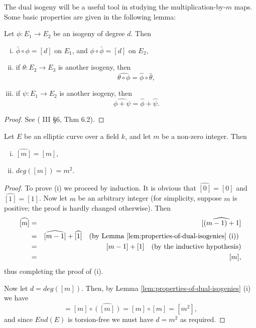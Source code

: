 The dual isogeny will be a useful tool in studying the multiplication-by-$m$ maps.
Some basic properties are given in the following lemma:
\begin{lem}
  \label{lem:properties-of-dual-isogenies}
  Let $\phi \colon E_{1} \rightarrow E_{2}$ be an isogeny of degree $d$.  Then
  \begin{enumerate}[(i)]
  \item $\bar{\phi} \circ \phi = \left[ d \right]$ on $E_{1}$, and $\phi \circ
    \bar{\phi} = \left[ d \right]$ on $E_{2}$,
  \item if $\theta \colon E_{2} \rightarrow E_{3}$ is another isogeny, then
    \begin{equation*}
      \widehat{\theta \circ \phi} = \hat{\phi} \circ \hat{\theta},
    \end{equation*}
  \item if $\psi \colon E_{1} \rightarrow E_{2}$ is another isogeny, then
    \begin{equation*}
      \widehat{\phi + \psi} = \hat{\phi} + \hat{\psi}.
    \end{equation*}
  \end{enumerate}
\end{lem}
\begin{proof}
  See (\cite{silverman86} III \S 6, Thm 6.2).
\end{proof}

\begin{prop}
  \label{prop:properties-of-m-dual}
  Let $E$ be an elliptic curve over a field $k$, and let $m$ be a non-zero integer.
  Then
  \begin{enumerate}[(i)]
  \item $\widehat{[m]} = [m]$,
  \item $deg([m]) = m^{2}$.
  \end{enumerate}
\end{prop}

\begin{proof}
  To prove (i) we proceed by induction.  It is obvious that $\widehat{[0]} = [0]$ and
  $\widehat{[1]} = [1]$.  Now let $m$ be an arbitrary integer (for simplicity,
  suppose $m$ is positive; the proof is hardly changed otherwise). Then
  \begin{eqnarray*}
    \widehat{[m]}&=&\widehat{[(m-1) + 1]}\\
    &=&\widehat{[m-1]} + \widehat{[1]} \quad \text{(by Lemma
      \ref{lem:properties-of-dual-isogenies} (i)) }\\
    &=&[m-1] + [1] \quad \text{(by the inductive hypothesis)}\\
    &=&[m],
  \end{eqnarray*}
  thus completing the proof of (i).

  Now let $d = deg([m])$.  Then, by Lemma \ref{lem:properties-of-dual-isogenies} (i)
  we have
  \begin{equation*}
    [d] = [m] \circ \widehat{([m])} = [m] \circ [m] = [m^{2}],
  \end{equation*}
  and since $End(E)$ is torsion-free we must have $d = m^{2}$ as required.
\end{proof}

